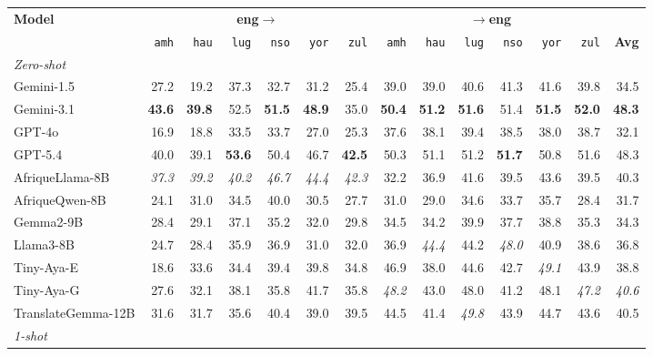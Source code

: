 \begin{table}[t]
\centering
\small
\renewcommand{\arraystretch}{1.05}
\begin{tabular}{lrrrrrrrrrrrrr}
\toprule
\textbf{Model} & \multicolumn{6}{c}{\textbf{eng$\to$}} & \multicolumn{6}{c}{\textbf{$\to$eng}} & \\
\cmidrule(lr){2-7}\cmidrule(lr){8-13}
   & \texttt{amh} & \texttt{hau} & \texttt{lug} & \texttt{nso} & \texttt{yor} & \texttt{zul} & \texttt{amh} & \texttt{hau} & \texttt{lug} & \texttt{nso} & \texttt{yor} & \texttt{zul} & \textbf{Avg} \\
\midrule
\multicolumn{14}{l}{\textit{Zero-shot}} \\
\midrule
Gemini-1.5 & 27.2 & 19.2 & 37.3 & 32.7 & 31.2 & 25.4 & 39.0 & 39.0 & 40.6 & 41.3 & 41.6 & 39.8 & 34.5 \\
Gemini-3.1 & \textbf{43.6} & \textbf{39.8} & 52.5 & \textbf{51.5} & \textbf{48.9} & 35.0 & \textbf{50.4} & \textbf{51.2} & \textbf{51.6} & 51.4 & \textbf{51.5} & \textbf{52.0} & \textbf{48.3} \\
GPT-4o & 16.9 & 18.8 & 33.5 & 33.7 & 27.0 & 25.3 & 37.6 & 38.1 & 39.4 & 38.5 & 38.0 & 38.7 & 32.1 \\
GPT-5.4 & 40.0 & 39.1 & \textbf{53.6} & 50.4 & 46.7 & \textbf{42.5} & 50.3 & 51.1 & 51.2 & \textbf{51.7} & 50.8 & 51.6 & 48.3 \\
\midrule
AfriqueLlama-8B & \emph{37.3} & \emph{39.2} & \emph{40.2} & \emph{46.7} & \emph{44.4} & \emph{42.3} & 32.2 & 36.9 & 41.6 & 39.5 & 43.6 & 39.5 & 40.3 \\
AfriqueQwen-8B & 24.1 & 31.0 & 34.5 & 40.0 & 30.5 & 27.7 & 31.0 & 29.0 & 34.6 & 33.7 & 35.7 & 28.4 & 31.7 \\
Gemma2-9B & 28.4 & 29.1 & 37.1 & 35.2 & 32.0 & 29.8 & 34.5 & 34.2 & 39.9 & 37.7 & 38.8 & 35.3 & 34.3 \\
Llama3-8B & 24.7 & 28.4 & 35.9 & 36.9 & 31.0 & 32.0 & 36.9 & \emph{44.4} & 44.2 & \emph{48.0} & 40.9 & 38.6 & 36.8 \\
Tiny-Aya-E & 18.6 & 33.6 & 34.4 & 39.4 & 39.8 & 34.8 & 46.9 & 38.0 & 44.6 & 42.7 & \emph{49.1} & 43.9 & 38.8 \\
Tiny-Aya-G & 27.6 & 32.1 & 38.1 & 35.8 & 41.7 & 35.8 & \emph{48.2} & 43.0 & 48.0 & 41.2 & 48.1 & \emph{47.2} & \emph{40.6} \\
TranslateGemma-12B & 31.6 & 31.7 & 35.6 & 40.4 & 39.0 & 39.5 & 44.5 & 41.4 & \emph{49.8} & 43.9 & 44.7 & 43.6 & 40.5 \\
\midrule\midrule
\multicolumn{14}{l}{\textit{1-shot}} \\

\end{tabular}
\end{table}
